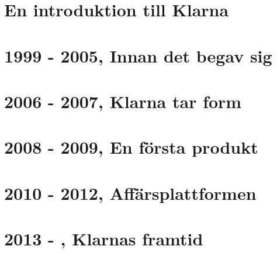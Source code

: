 \documentclass[10pt, a4paper, twoside]{article}
\numberwithin{equation}{subsection}
\numberwithin{figure}{section}
\numberwithin{table}{section}
\begin{document}



\newpage
\pagestyle{fancy}
\setcounter{page}{2} %

%

\newpage
\tableofcontents
\listoffigures

%
%
\newpage
{}


\newpage
\section{En introduktion till Klarna}
\label{sec:introduction}


\newpage
\section{1999 - 2005, Innan det begav sig}
\label{sec:earlyDevelopment}


\newpage
\section{2006 - 2007, Klarna tar form}
\label{sec:firstYears}


\newpage
\section{2008 - 2009, En första produkt}
\label{sec:firstProduct}


\newpage
\section{2010 - 2012, Affärsplattformen}
\label{sec:businessPlatform}


\newpage
\section{2013 - , Klarnas framtid}
\label{sec:future}



%
%

\newpage

\end{document}
